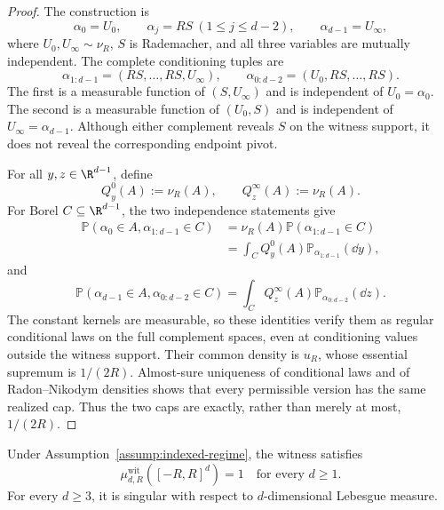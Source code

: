 \begin{proof}
The construction is
\[
\alpha_0=U_0,\qquad
\alpha_j=RS\ (1\leq j\leq d-2),\qquad
\alpha_{d-1}=U_\infty,
\]
where $U_0,U_\infty\sim\nu_R$, $S$ is Rademacher, and all three variables
are mutually independent.  The complete conditioning tuples are
\[
\alpha_{1:d-1}=(RS,\ldots,RS,U_\infty),\qquad
\alpha_{0:d-2}=(U_0,RS,\ldots,RS).
\]
The first is a measurable function of $(S,U_\infty)$ and is independent of
$U_0=\alpha_0$.  The second is a measurable function of $(U_0,S)$ and is
independent of $U_\infty=\alpha_{d-1}$.  Although either complement reveals
$S$ on the witness support, it does not reveal the corresponding endpoint
pivot.

For all $y,z\in\R^{d-1}$, define
\[
Q^0_y(A):=\nu_R(A),\qquad Q^\infty_z(A):=\nu_R(A).
\]
For Borel $C\subseteq\R^{d-1}$, the two independence statements give
\[
\begin{aligned}
\mathbb P(\alpha_0\in A,\alpha_{1:d-1}\in C)
&=\nu_R(A)\mathbb P(\alpha_{1:d-1}\in C)\\
&=\int_CQ^0_y(A)\mathbb P_{\alpha_{1:d-1}}(\dd y),
\end{aligned}
\]
and
\[
\mathbb P(\alpha_{d-1}\in A,\alpha_{0:d-2}\in C)
=\int_CQ^\infty_z(A)\mathbb P_{\alpha_{0:d-2}}(\dd z).
\]
The constant kernels are measurable, so these identities verify them as
regular conditional laws on the full complement spaces, even at conditioning
values outside the witness support.  Their common density is $u_R$, whose
essential supremum is $1/(2R)$.  Almost-sure uniqueness of conditional laws
\cite[Theorem~6.3]{Kallenberg2002} and of Radon--Nikodym densities
\cite[Theorem~3.8]{Folland1999} shows that every permissible version has the
same realized cap.  Thus the two caps are exactly, rather than merely at
most, $1/(2R)$.
\end{proof}

\begin{proposition}
\label{prop:witness-support-singularity}
Under Assumption~\ref{assump:indexed-regime}, the witness satisfies
\[
\mu^{\mathrm{wit}}_{d,R}([-R,R]^d)=1
\quad\text{for every }d\geq1.
\]
For every $d\geq3$, it is singular with respect to $d$-dimensional Lebesgue
measure.
\end{proposition}

